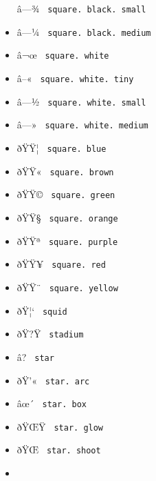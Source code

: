 \begin{itemize}
  \label{symbol-square.black.small}{{ â---¾ }
  \texttt{\ square.\ black.\ small\ }}
\item
  \label{symbol-square.black.medium}{{ â---¼ }
  \texttt{\ square.\ black.\ medium\ }}
\item
  \label{symbol-square.white}{{ â¬œ }
  \texttt{\ square.\ white\ }}
\item
  \label{symbol-square.white.tiny}{{ â--« }
  \texttt{\ square.\ white.\ tiny\ }}
\item
  \label{symbol-square.white.small}{{ â---½ }
  \texttt{\ square.\ white.\ small\ }}
\item
  \label{symbol-square.white.medium}{{ â---» }
  \texttt{\ square.\ white.\ medium\ }}
\item
  \label{symbol-square.blue}{{ ðŸŸ¦ }
  \texttt{\ square.\ blue\ }}
\item
  \label{symbol-square.brown}{{ ðŸŸ« }
  \texttt{\ square.\ brown\ }}
\item
  \label{symbol-square.green}{{ ðŸŸ© }
  \texttt{\ square.\ green\ }}
\item
  \label{symbol-square.orange}{{ ðŸŸ§ }
  \texttt{\ square.\ orange\ }}
\item
  \label{symbol-square.purple}{{ ðŸŸª }
  \texttt{\ square.\ purple\ }}
\item
  \label{symbol-square.red}{{ ðŸŸ¥ }
  \texttt{\ square.\ red\ }}
\item
  \label{symbol-square.yellow}{{ ðŸŸ¨ }
  \texttt{\ square.\ yellow\ }}
\item
  \label{symbol-squid}{{ ðŸ¦` } \texttt{\ squid\ }}
\item
  \label{symbol-stadium}{{ ðŸ?Ÿ } \texttt{\ stadium\ }}
\item
  \label{symbol-star}{{ â­? } \texttt{\ star\ }}
\item
  \label{symbol-star.arc}{{ ðŸ'« }
  \texttt{\ star.\ arc\ }}
\item
  \label{symbol-star.box}{{ âœ´ }
  \texttt{\ star.\ box\ }}
\item
  \label{symbol-star.glow}{{ ðŸŒŸ }
  \texttt{\ star.\ glow\ }}
\item
  \label{symbol-star.shoot}{{ ðŸŒ }
  \texttt{\ star.\ shoot\ }}
\item

\end{itemize}
